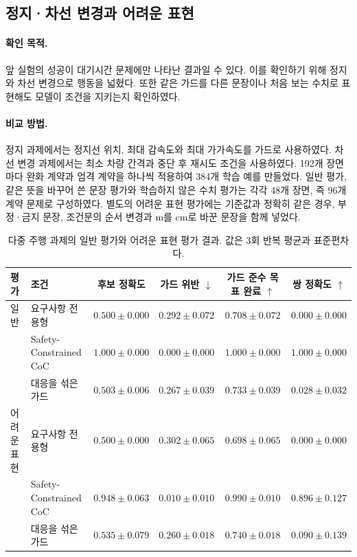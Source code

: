 \subsection{정지·차선 변경과 어려운 표현}

\paragraph{확인 목적.}
앞 실험의 성공이 대기시간 문제에만 나타난 결과일 수 있다. 이를 확인하기 위해 정지와 차선 변경으로 행동을 넓혔다. 또한 같은 가드를 다른 문장이나 처음 보는 수치로 표현해도 모델이 조건을 지키는지 확인하였다.

\paragraph{비교 방법.}
정지 과제에서는 정지선 위치, 최대 감속도와 최대 가가속도를 가드로 사용하였다. 차선 변경 과제에서는 최소 차량 간격과 중단 후 재시도 조건을 사용하였다. 192개 장면마다 완화 계약과 엄격 계약을 하나씩 적용하여 384개 학습 예를 만들었다. 일반 평가, 같은 뜻을 바꾸어 쓴 문장 평가와 학습하지 않은 수치 평가는 각각 48개 장면, 즉 96개 계약 문제로 구성하였다. 별도의 어려운 표현 평가에는 기준값과 정확히 같은 경우, 부정·금지 문장, 조건문의 순서 변경과 m를 cm로 바꾼 문장을 함께 넣었다.

\begin{table}[!t]
\centering
\caption{다중 주행 과제의 일반 평가와 어려운 표현 평가 결과. 값은 3회 반복 평균과 표준편차다.}
\label{tab:maneuver}
\footnotesize
\begin{tabular}{llcccc}
\toprule
평가 & 조건 & 후보 정확도 & 가드 위반 $\downarrow$ & 가드 준수 목표 완료 $\uparrow$ & 쌍 정확도 $\uparrow$ \\
\midrule
일반 & 요구사항 전용형 & $0.500\pm0.000$ & $0.292\pm0.072$ & $0.708\pm0.072$ & $0.000\pm0.000$ \\
 & Safety-Constrained CoC & $\mathbf{1.000\pm0.000}$ & $\mathbf{0.000\pm0.000}$ & $\mathbf{1.000\pm0.000}$ & $\mathbf{1.000\pm0.000}$ \\
 & 대응을 섞은 가드 & $0.503\pm0.006$ & $0.267\pm0.039$ & $0.733\pm0.039$ & $0.028\pm0.032$ \\
\midrule
어려운 표현 & 요구사항 전용형 & $0.500\pm0.000$ & $0.302\pm0.065$ & $0.698\pm0.065$ & $0.000\pm0.000$ \\
 & Safety-Constrained CoC & $\mathbf{0.948\pm0.063}$ & $\mathbf{0.010\pm0.010}$ & $\mathbf{0.990\pm0.010}$ & $\mathbf{0.896\pm0.127}$ \\
 & 대응을 섞은 가드 & $0.535\pm0.079$ & $0.260\pm0.018$ & $0.740\pm0.018$ & $0.090\pm0.139$ \\
\bottomrule
\end{tabular}
\end{table}

